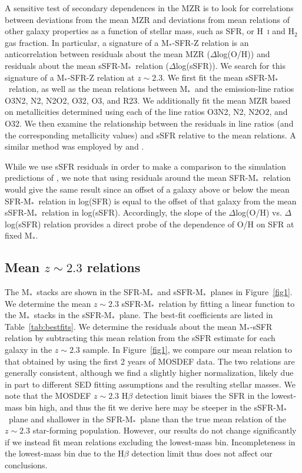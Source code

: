 \documentclass[iop,twocolappendix]{emulateapj}
\newcommand{\mstar}{$\mbox{M}_*$}
\begin{document}
A sensitive test of secondary dependences in the MZR is to look for correlations
 between deviations from the mean MZR and deviations from mean relations of other galaxy properties
 as a function of stellar mass, such as SFR, or H~\textsc{i} and H$_2$ gas fraction.
  In particular, a signature of a \mstar-SFR-Z relation is an
 anticorrelation between residuals about the mean MZR ($\Delta$log(O/H)) and residuals about
 the mean sSFR-\mstar\ relation ($\Delta$log(sSFR)).
  We search for this signature of a \mstar-SFR-Z relation at $z\sim2.3$.
  We first fit the mean sSFR-\mstar\ relation, as well as the mean relations between \mstar\
 and the emission-line ratios O3N2, N2, N2O2, O32, O3, and R23.  We additionally fit the mean MZR
 based on metallicities determined using each of the line ratios O3N2, N2, N2O2, and O32.
  We then examine the relationship between the residuals in line ratios (and the corresponding
 metallicity values) and sSFR relative to the mean relations.
  A similar method was employed by \citet{sal15} and \citet{kas17}.

While we use sSFR residuals in order to make a comparison to the simulation predictions of
 \citet{dav17}, we note that using residuals around the mean SFR-\mstar\ relation would give the
 same result since an offset of a galaxy above or below the mean SFR-\mstar\ relation in log(SFR)
 is equal to the offset of that galaxy from the mean sSFR-\mstar\ relation in log(sSFR).
  Accordingly, the slope of the $\Delta$log(O/H) vs. $\Delta$log(sSFR) relation provides a
 direct probe of the dependence of O/H on SFR at fixed \mstar.

\subsection{Mean $z\sim2.3$ relations}

The \mstar\ stacks are shown in the SFR-\mstar\ and sSFR-\mstar\ planes in Figure~\ref{fig1}.
We determine the mean $z\sim2.3$ sSFR-\mstar\ relation by fitting a linear function
 to the \mstar\ stacks in the sSFR-\mstar\ plane.
The best-fit coefficients are listed in Table~\ref{tab:bestfits}.
  We determine the residuals about the mean \mstar-sSFR relation
 by subtracting this mean relation from the sSFR estimate for each
 galaxy in the $z\sim2.3$ sample.  
  In Figure~\ref{fig1}, we compare our mean relation to that obtained by \citet{shi15} using the first 2 years of
 MOSDEF data.  The two relations are generally consistent, although we find a slightly
 higher normalization, likely due in part to different SED fitting assumptions and the resulting
 stellar masses.
  We note that the MOSDEF $z\sim2.3$ H$\beta$ detection limit biases the SFR in the lowest-mass
 bin high, and thus the fit we derive here may be steeper in the sSFR-\mstar\ plane and shallower in the SFR-\mstar\
 plane than the true mean relation of the $z\sim2.3$ star-forming population.  However, our results do not
 change significantly if we instead fit mean relations excluding the lowest-mass bin.
  Incompleteness in the lowest-mass bin due to the H$\beta$ detection limit thus does not
 affect our conclusions.
\end{document}
